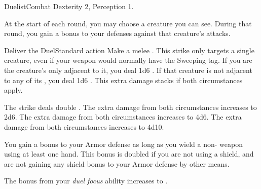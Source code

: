   \begin{feat}{Duelist}{Combat}
    \featpre Dexterity 2, Perception 1.

     At the start of each round, you may choose a creature you can see.
    During that round, you gain a  bonus to your defenses against that creature's attacks.

    \begin{activeability}{Deliver the Duel}{Standard action}
      \rankline
      Make a melee .
      This strike only targets a single creature, even if your weapon would normally have the Sweeping tag.
      If you are the creature's only  adjacent to it, you deal 1d6 .
      If that creature is not adjacent to any of its , you deal 1d6 .
      This extra damage stacks if both circumstances apply.

      \rankline
       The strike deals double .
       The extra damage from both circumstances increases to 2d6.
       The extra damage from both circumstances increases to 4d6.
       The extra damage from both circumstances increases to 4d10.
    \end{activeability}

     You gain a  bonus to your Armor defense as long as you wield a non- weapon using at least one hand.
    This bonus is doubled if you are not using a shield, and are not gaining any shield bonus to your Armor defense by other means.

     The bonus from your \textit{duel focus} ability increases to .
  \end{feat}


